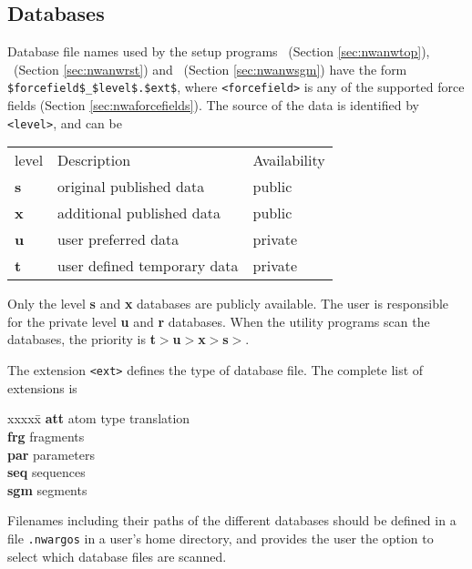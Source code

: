 \subsection{Databases}
Database file names used by the setup programs \nwtop\ (Section \ref{sec:nwanwtop}), 
\nwrst\ (Section \ref{sec:nwanwrst}) and \nwsgm\ (Section \ref{sec:nwanwsgm}) have the form
\verb+$forcefield$_$level$.$ext$+, where \verb+<forcefield>+ is any of the
supported force fields (Section \ref{sec:nwaforcefields}). The source of the data is 
identified by \verb+<level>+, and can be 
\begin{center}
\begin{tabular}{lll}
\hline
level   & Description                 & Availability \\
{\bf s} & original published data     & public       \\
{\bf x} & additional published data   & public       \\
{\bf u} & user preferred data         & private      \\
{\bf t} & user defined temporary data & private    \\
\hline
\end{tabular}
\end{center}

Only the level {\bf s} and {\bf x} databases are publicly available. 
The user is responsible for the private level {\bf u} and {\bf r}
databases. When the utility programs scan the databases, the priority
is {\bf t}$>${\bf u}$>${\bf x}$>${\bf s}$>$.

The extension \verb+<ext>+ defines the type of database file. The
complete list of extensions is
\begin{tabbing}
xxxxx\=\kill
{\bf att} \> atom type translation\\
{\bf frg} \> fragments\\
{\bf par} \> parameters\\
{\bf seq} \> sequences\\
{\bf sgm} \> segments\\
\end{tabbing} 

Filenames including their paths of the different databases should be 
defined in a file 
{\tt .nwargos} in a user's home directory, and provides the user the
option to select which database files are scanned.

